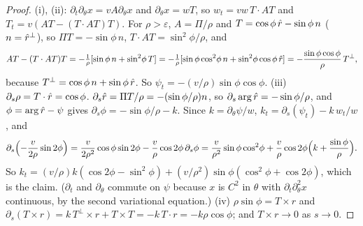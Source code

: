 \begin{proof}
(i), (ii): $\partial_t\partial_\theta x=vA\partial_\theta x$ and $\partial_\theta x=wT$, so $w_t=vw\,T\cdot AT$ and
$T_t=v(AT-(T\cdot AT)T)$. For $\rho>\varepsilon$, $A=\Pi/\rho$ and $T=\cos\phi\,\hat r-\sin\phi\,n$ ($n=\hat r^\perp$), so
$\Pi T=-\sin\phi\,n$, $T\cdot AT=\sin^2\!\phi/\rho$, and
\[
AT-(T\cdot AT)T=-\tfrac1\rho[\sin\phi\,n+\sin^2\!\phi\,T]=-\tfrac1\rho[\sin\phi\cos^2\!\phi\,n+\sin^2\!\phi\cos\phi\,\hat r]
=-\frac{\sin\phi\cos\phi}{\rho}\,T^\perp,
\]
because $T^\perp=\cos\phi\,n+\sin\phi\,\hat r$. So $\psi_t=-(v/\rho)\sin\phi\cos\phi$.
(iii) $\partial_s\rho=T\cdot\hat r=\cos\phi$. $\partial_s\hat r=\Pi T/\rho=-(\sin\phi/\rho)n$, so
$\partial_s\arg\hat r=-\sin\phi/\rho$, and $\phi=\arg\hat r-\psi$ gives $\partial_s\phi=-\sin\phi/\rho-k$. Since
$k=\partial_\theta\psi/w$, $k_t=\partial_s(\psi_t)-k\,w_t/w$, and
\[
\partial_s\Bigl(-\frac v{2\rho}\sin2\phi\Bigr)=\frac v{2\rho^2}\cos\phi\sin2\phi-\frac v\rho\cos2\phi\,\partial_s\phi
=\frac v{\rho^2}\sin\phi\cos^2\!\phi+\frac v\rho\cos2\phi\Bigl(k+\frac{\sin\phi}\rho\Bigr).
\]
So $k_t=(v/\rho)k(\cos2\phi-\sin^2\!\phi)+(v/\rho^2)\sin\phi(\cos^2\!\phi+\cos2\phi)$, which is the claim. ($\partial_t$ and
$\partial_\theta$ commute on $\psi$ because $x$ is $C^2$ in $\theta$ with $\partial_t\partial_\theta^2x$ continuous, by the second
variational equation.)
(iv) $\rho\sin\phi=T\times r$ and $\partial_s(T\times r)=k\,T^\perp\times r+T\times T=-k\,T\cdot r=-k\rho\cos\phi$; and
$T\times r\to0$ as $s\to0$.
\end{proof}

